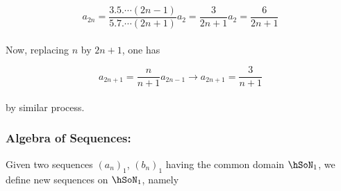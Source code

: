 \documentclass[11pt]{amsbook}
\begin{document}
	\[
		a_{2n} = \frac{3.  5.  
		\cdots  (2n-1)}{5.  7.   
		\cdots  (2n+1)}a_2 = 
		\frac{3}{2n+1}a_2 =
		\frac{6}{2n+1}
	\]\\
	
	Now, replacing $n$ by $2n+1$, one has

	\[
		a_{2n+1} = \frac{n}{n+1}a_{2n-1} \longrightarrow a_{2n+1} = \frac{3}{n+1}
	\]
	\\
	by similar process. \\

\subsubsection{Algebra of Sequences:}
\label{subsubsec:Algebra of Sequences} 
Given two sequences $(a_n)_1$, $(b_n)_1$ having the common domain $\hSoN_{1}$, we define new sequences on $\hSoN_1$, namely \\


\end{document}
